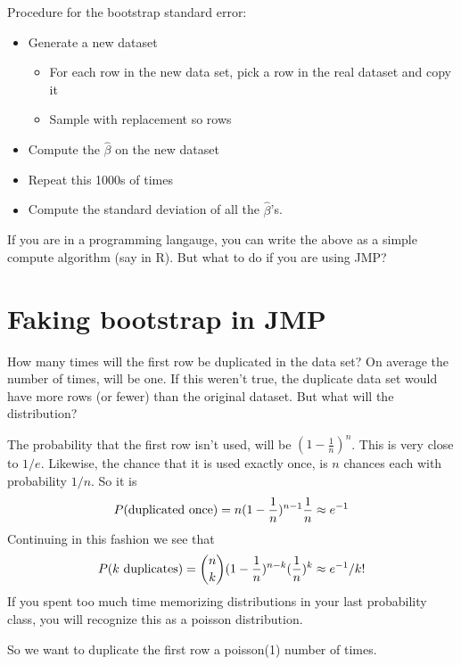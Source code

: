 \documentclass{article}
\begin{document}
Procedure for the bootstrap standard error:
\begin{itemize}
\item Generate a new dataset
\begin{itemize}
\item For each row in the new data set, pick a row in the real dataset
and copy it
\item Sample with replacement so rows 
\end{itemize}
\item Compute the $\hat\beta$ on the new dataset
\item Repeat this 1000s of times
\item Compute the standard deviation of all the $\hat\beta$'s.
\end{itemize}

If you are in a programming langauge, you can write the above as a
simple compute algorithm (say in R).  But what to do if you are using
JMP? 

\section{Faking bootstrap in JMP}

How many times will the first row be duplicated in the data set?  On
average the number of times, will be one.  If this weren't true, the
duplicate data set would have more rows (or fewer) than the original
dataset.  But what will the distribution?

The probability that the first row isn't used, will be
$(1-\frac{1}{n})^n$.  This is very close to $1/e$.  Likewise, the
chance that it is used exactly once, is $n$ chances each with
probability $1/n$.  So it is 
\begin{displaymath}
P(\hbox{duplicated once}) = n (1-\frac{1}{n})^{n-1}\frac{1}{n} \approx e^{-1}
\end{displaymath}
Continuing in this fashion we see that
\begin{displaymath}
P(k \hbox{ duplicates}) = {n \choose k} (1-\frac{1}{n})^{n-k}(\frac{1}{n})^k \approx e^{-1}/k!
\end{displaymath}
If you spent too much time memorizing distributions in your last
probability class, you will recognize this as a poisson distribution. 

So we want to duplicate the first row a poisson(1) number of times.  
\end{document}
